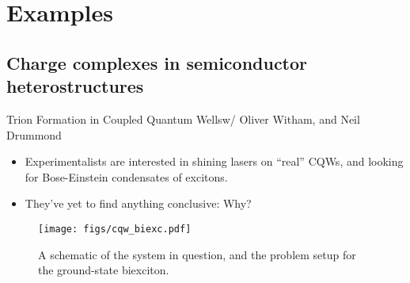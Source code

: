 \documentclass[12pt, pdf, hyperref={draft}, usenames, dvipsnames]{beamer}
\begin{document}

\section{Examples}
\subsection{Charge complexes in semiconductor heterostructures}

\begin{frame}{Trion Formation in Coupled Quantum Wells}{w/ Oliver Witham, and
Neil Drummond}


\begin{minipage}[t]{0.55\textwidth}

\vspace{1cm}
\begin{itemize}
  \item Experimentalists are interested in shining lasers on ``real'' CQWs, and
  looking for Bose-Einstein condensates of excitons.\footnotemark%
  \vspace{0.5cm}

  \item They've yet to find anything conclusive: Why?
\end{itemize}
\vspace{1cm}

\end{minipage}%
\hfill
\begin{minipage}[t]{0.4\textwidth}

\begin{figure}[H]
  \centering
  \texttt{[image: figs/cqw\_biexc.pdf]}
  \caption{A schematic of the system in question, and the problem setup for the
  ground-state biexciton.}
\label{fig:biex}
\end{figure}

\end{minipage}%
\end{frame}
\end{document}
